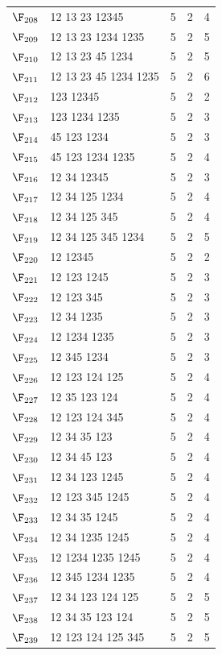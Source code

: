 {\begin{longtable}{c p{7cm} c c c}
$\F_{208}$ & 12 13 23 12345 & 5 & 2 & 4 \\
$\F_{209}$ & 12 13 23 1234 1235 & 5 & 2 & 5 \\
$\F_{210}$ & 12 13 23 45 1234 & 5 & 2 & 5 \\
$\F_{211}$ & 12 13 23 45 1234 1235 & 5 & 2 & 6 \\
$\F_{212}$ & 123 12345 & 5 & 2 & 2 \\
$\F_{213}$ & 123 1234 1235 & 5 & 2 & 3 \\
$\F_{214}$ & 45 123 1234 & 5 & 2 & 3 \\
$\F_{215}$ & 45 123 1234 1235 & 5 & 2 & 4 \\
$\F_{216}$ & 12 34 12345 & 5 & 2 & 3 \\
$\F_{217}$ & 12 34 125 1234 & 5 & 2 & 4 \\
$\F_{218}$ & 12 34 125 345 & 5 & 2 & 4 \\
$\F_{219}$ & 12 34 125 345 1234 & 5 & 2 & 5 \\
$\F_{220}$ & 12 12345 & 5 & 2 & 2 \\
$\F_{221}$ & 12 123 1245 & 5 & 2 & 3 \\
$\F_{222}$ & 12 123 345 & 5 & 2 & 3 \\
$\F_{223}$ & 12 34 1235 & 5 & 2 & 3 \\
$\F_{224}$ & 12 1234 1235 & 5 & 2 & 3 \\
$\F_{225}$ & 12 345 1234 & 5 & 2 & 3 \\
$\F_{226}$ & 12 123 124 125 & 5 & 2 & 4 \\
$\F_{227}$ & 12 35 123 124 & 5 & 2 & 4 \\
$\F_{228}$ & 12 123 124 345 & 5 & 2 & 4 \\
$\F_{229}$ & 12 34 35 123 & 5 & 2 & 4 \\
$\F_{230}$ & 12 34 45 123 & 5 & 2 & 4 \\
$\F_{231}$ & 12 34 123 1245 & 5 & 2 & 4 \\
$\F_{232}$ & 12 123 345 1245 & 5 & 2 & 4 \\
$\F_{233}$ & 12 34 35 1245 & 5 & 2 & 4 \\
$\F_{234}$ & 12 34 1235 1245 & 5 & 2 & 4 \\
$\F_{235}$ & 12 1234 1235 1245 & 5 & 2 & 4 \\
$\F_{236}$ & 12 345 1234 1235 & 5 & 2 & 4 \\
$\F_{237}$ & 12 34 123 124 125 & 5 & 2 & 5 \\
$\F_{238}$ & 12 34 35 123 124 & 5 & 2 & 5 \\
$\F_{239}$ & 12 123 124 125 345 & 5 & 2 & 5 \\

\end{longtable}}

